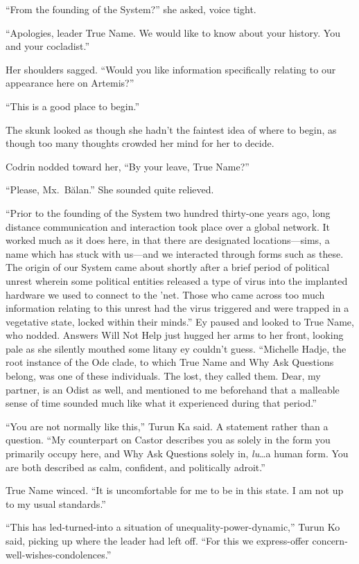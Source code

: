 ``From the founding of the System?'' she asked, voice tight.

``Apologies, leader True Name. We would like to know about your history. You and your cocladist.''

Her shoulders sagged. ``Would you like information specifically relating to our appearance here on Artemis?''

``This is a good place to begin.''

The skunk looked as though she hadn't the faintest idea of where to begin, as though too many thoughts crowded her mind for her to decide.

Codrin nodded toward her, ``By your leave, True Name?''

``Please, Mx.~Bălan.'' She sounded quite relieved.

``Prior to the founding of the System two hundred thirty-one years ago, long distance communication and interaction took place over a global network. It worked much as it does here, in that there are designated locations—sims, a name which has stuck with us—and we interacted through forms such as these. The origin of our System came about shortly after a brief period of political unrest wherein some political entities released a type of virus into the implanted hardware we used to connect to the 'net. Those who came across too much information relating to this unrest had the virus triggered and were trapped in a vegetative state, locked within their minds.'' Ey paused and looked to True Name, who nodded. Answers Will Not Help just hugged her arms to her front, looking pale as she silently mouthed some litany ey couldn't guess. ``Michelle Hadje, the root instance of the Ode clade, to which True Name and Why Ask Questions belong, was one of these individuals. The lost, they called them. Dear, my partner, is an Odist as well, and mentioned to me beforehand that a malleable sense of time sounded much like what it experienced during that period.''

``You are not normally like this,'' Turun Ka said. A statement rather than a question. ``My counterpart on Castor describes you as solely in the form you primarily occupy here, and Why Ask Questions solely in, \emph{lu}\ldots a human form. You are both described as calm, confident, and politically adroit.''

True Name winced. ``It is uncomfortable for me to be in this state. I am not up to my usual standards.''

``This has led-turned-into a situation of unequality-power-dynamic,'' Turun Ko said, picking up where the leader had left off. ``For this we express-offer concern-well-wishes-condolences.''

